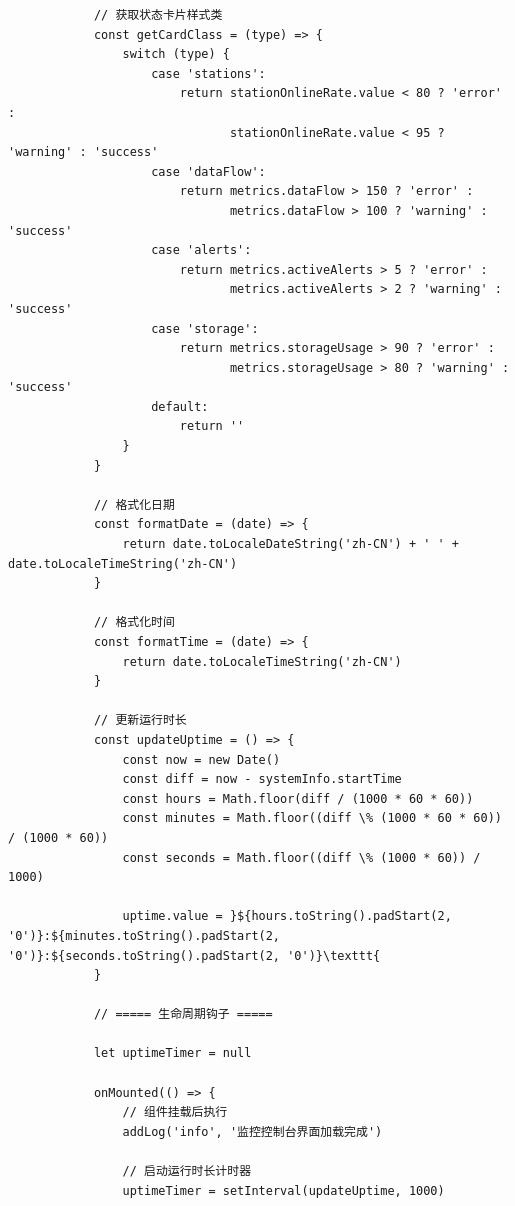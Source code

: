 {{\begin{verbatim}
            // 获取状态卡片样式类
            const getCardClass = (type) => {
                switch (type) {
                    case 'stations':
                        return stationOnlineRate.value < 80 ? 'error' : 
                               stationOnlineRate.value < 95 ? 'warning' : 'success'
                    case 'dataFlow':
                        return metrics.dataFlow > 150 ? 'error' : 
                               metrics.dataFlow > 100 ? 'warning' : 'success'
                    case 'alerts':
                        return metrics.activeAlerts > 5 ? 'error' : 
                               metrics.activeAlerts > 2 ? 'warning' : 'success'
                    case 'storage':
                        return metrics.storageUsage > 90 ? 'error' : 
                               metrics.storageUsage > 80 ? 'warning' : 'success'
                    default:
                        return ''
                }
            }
            
            // 格式化日期
            const formatDate = (date) => {
                return date.toLocaleDateString('zh-CN') + ' ' + date.toLocaleTimeString('zh-CN')
            }
            
            // 格式化时间
            const formatTime = (date) => {
                return date.toLocaleTimeString('zh-CN')
            }
            
            // 更新运行时长
            const updateUptime = () => {
                const now = new Date()
                const diff = now - systemInfo.startTime
                const hours = Math.floor(diff / (1000 * 60 * 60))
                const minutes = Math.floor((diff \% (1000 * 60 * 60)) / (1000 * 60))
                const seconds = Math.floor((diff \% (1000 * 60)) / 1000)
                
                uptime.value = }${hours.toString().padStart(2, '0')}:${minutes.toString().padStart(2, '0')}:${seconds.toString().padStart(2, '0')}\texttt{
            }
            
            // ===== 生命周期钩子 =====
            
            let uptimeTimer = null
            
            onMounted(() => {
                // 组件挂载后执行
                addLog('info', '监控控制台界面加载完成')
                
                // 启动运行时长计时器
                uptimeTimer = setInterval(updateUptime, 1000)
                

\end{verbatim}}}
